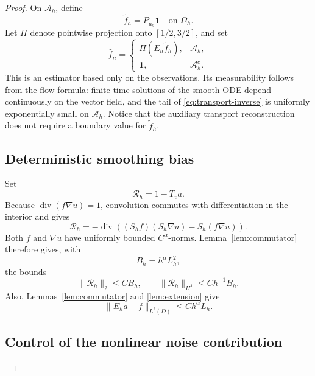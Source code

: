 \documentclass[11pt]{article}
\theoremstyle{remark}
\newcommand{\one}{\mathbf 1}
\DeclareMathOperator{\divergence}{div}
\begin{document}
\begin{proof}
On \(\mathcal A_h\), define
\[
\widetilde f_h=P_{\widehat u_h}\one
\quad\text{on }\Omega_h.
\]
Let \(\Pi\) denote pointwise projection onto \([1/2,3/2]\), and set
\[
\widehat f_n=
\begin{cases}
\Pi(E_h\widetilde f_h),&\mathcal A_h,\\
\one,&\mathcal A_h^c.
\end{cases}
\]
This is an estimator based only on the observations.
Its measurability follows from the flow formula:
finite-time solutions of the smooth ODE depend continuously on the
vector field, and the tail of \eqref{eq:transport-inverse} is uniformly
exponentially small on \(\mathcal A_h\).
Notice that the auxiliary transport reconstruction does not require
a boundary value for \(\widetilde f_h\).

\subsection*{Deterministic smoothing bias}

Set
\[
\mathcal R_h=1-T_va.
\]
Because \(\divergence(f\nabla u)=1\), convolution commutes with
differentiation in the interior and gives
\[
\mathcal R_h
=-\divergence\left((S_hf)(S_h\nabla u)-S_h(f\nabla u)\right).
\]
Both \(f\) and \(\nabla u\) have uniformly bounded \(C^\alpha\)-norms.
Lemma~\ref{lem:commutator} therefore gives, with
\[
B_h=h^\alpha L_h^2,
\]
the bounds
\begin{equation}\label{eq:residual-bounds}
\|\mathcal R_h\|_2\leq CB_h,\qquad
\|\mathcal R_h\|_{H^1}\leq Ch^{-1}B_h.
\end{equation}
Also, Lemmas~\ref{lem:commutator} and \ref{lem:extension} give
\begin{equation}\label{eq:completed-bias}
\|E_ha-f\|_{L^2(D)}\leq Ch^\alpha L_h.
\end{equation}

\subsection*{Control of the nonlinear noise contribution}


\end{proof}
\end{document}
